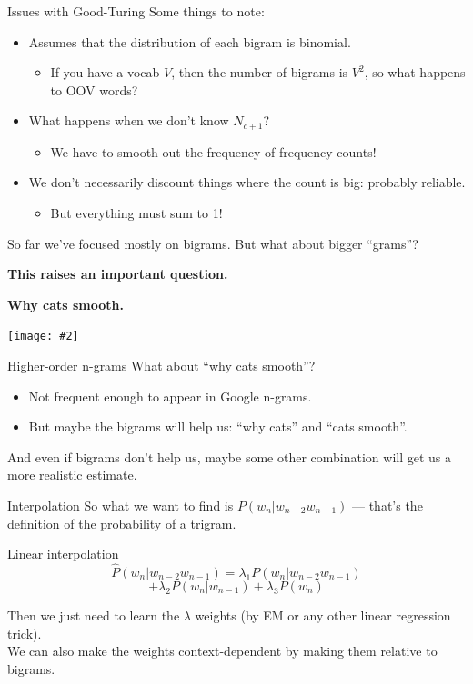 \documentclass{beamer}
\newcommand{\placard}[1]{
  \begin{frame}
    \begin{center}
      \huge
      \textbf{#1}
    \end{center}
  \end{frame}
}
\newcommand{\pagestep}[2]{
  \begin{frame}[t]
    \begin{minipage}[t][0.26\textheight][t]{\textwidth}
      \begin{center}
        \huge
        \textbf{#1}
      \end{center}
    \end{minipage}
    
    \begin{minipage}[t][0.7\textheight][c]{\textwidth}
      \begin{center}
        \texttt{[image: \#2]}
      \end{center}
    \end{minipage}
  \end{frame}
}
\begin{document}
\begin{frame}{Issues with Good-Turing}
  Some things to note:
  \begin{itemize}
  \item Assumes that the distribution of each bigram is binomial.\pause
    \begin{itemize}
    \item If you have a vocab $V$, then the number of bigrams is $V^2$, 
      so what happens to OOV words?\pause
    \end{itemize}
  \item What happens when we don't know $N_{c+1}$? \pause
    \begin{itemize}
    \item We have to smooth out the frequency of frequency counts!
    \end{itemize}\pause
  \item We don't necessarily discount things where the count is big:
    probably reliable.\pause
    \begin{itemize}
    \item But everything must sum to 1!
    \end{itemize}
  \end{itemize}
\end{frame}

\begin{frame}
  \begin{center}
    \huge
    So far we've focused mostly on bigrams. But what about bigger ``grams''?
  \end{center}
\end{frame}

\placard{This raises an important question.}

\pagestep{Why cats smooth.}{images/622119.jpg}

\begin{frame}{Higher-order n-grams}
  What about ``why cats smooth''?\pause
  \begin{itemize}
  \item Not frequent enough to appear in Google n-grams.\pause
  \item But maybe the bigrams will help us: ``why cats'' and ``cats smooth''.
  \end{itemize}\pause
  And even if bigrams don't help us, maybe some other combination will
  get us a more realistic estimate.
\end{frame}

\begin{frame}{Interpolation}
  So what we want to find is $P(w_n|w_{n-2}w_{n-1})$ --- that's 
  the definition of the probability of a trigram.\pause
  \begin{block}{Linear interpolation}
    \[\hat{P}(w_n|w_{n-2}w_{n-1}) = \lambda_1 P(w_n|w_{n-2}w_{n-1})\]
    \[+ \lambda_2 P(w_n|w_{n-1}) + \lambda_3 P(w_n)\]
  \end{block}\pause
  Then we just need to learn the $\lambda$ weights (by EM or 
  any other linear regression trick).\\\pause
  We can also make the weights context-dependent by making them relative
  to bigrams.
\end{frame}
\end{document}
